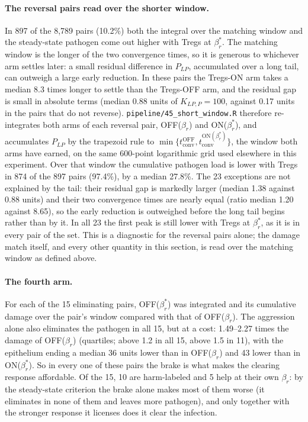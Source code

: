 \documentclass[11pt]{article}
\begin{document}
\paragraph{The reversal pairs read over the shorter window.}
In 897 of the 8,789 pairs (10.2\%) both the integral over the matching window and the
steady-state pathogen come out higher with Tregs at $\beta_r^{*}$. The matching window is the
longer of the two convergence times, so it is generous to whichever arm settles later: a small
residual difference in $P_{LP}$, accumulated over a long tail, can outweigh a large early
reduction. In these pairs the Tregs-ON arm takes a median 8.3 times longer to settle than the
Tregs-OFF arm, and the residual gap is small in absolute terms (median 0.88 units of
$K_{LP,P} = 100$, against 0.17 units in the pairs that do not reverse).
\texttt{pipeline/45\_short\_window.R} therefore re-integrates both arms of each reversal pair,
OFF($\beta_r$) and ON($\beta_r^{*}$), and accumulates $P_{LP}$ by the trapezoid rule to
$\min\{t_{\mathrm{conv}}^{\mathrm{OFF}}, t_{\mathrm{conv}}^{\mathrm{ON}(\beta_r^{*})}\}$, the
window both arms have earned, on the same 600-point logarithmic grid used elsewhere in this
experiment. Over that window the cumulative pathogen load is lower with Tregs in 874 of the
897 pairs (97.4\%), by a median 27.8\%. The 23 exceptions are not explained by the tail: their
residual gap is markedly larger (median 1.38 against 0.88 units) and their two convergence times
are nearly equal (ratio median 1.20 against 8.65), so the early reduction is outweighed before the
long tail begins rather than by it. In all 23 the first peak is still lower with Tregs at
$\beta_r^{*}$, as it is in every pair of the set. This is a diagnostic for the reversal pairs
alone; the damage match itself, and every other quantity in this section, is read over the
matching window as defined above.

\paragraph{The fourth arm.} For each of the 15 eliminating pairs, OFF($\beta_r^{*}$) was
integrated and its cumulative damage over the pair's window compared with that of OFF($\beta_r$).
The aggression alone also eliminates the pathogen in all 15, but at a cost: 1.49--2.27 times the
damage of OFF($\beta_r$) (quartiles; above 1.2 in all 15, above 1.5 in 11), with the epithelium
ending a median 36 units lower than in OFF($\beta_r$) and 43 lower than in ON($\beta_r^{*}$). So in every one of these pairs the brake is what makes
the clearing response affordable. Of the 15, 10 are harm-labeled and 5 help at
their own $\beta_r$: by the steady-state criterion the brake alone makes most of them worse
(it eliminates in none of them and leaves more pathogen), and only together with the stronger
response it licenses does it clear the infection.
\end{document}
